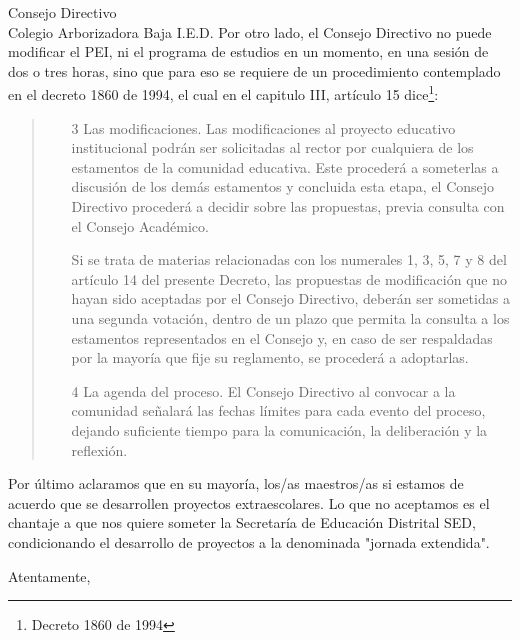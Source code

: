 \documentclass[letterpaper,spanish]{letter}
\begin{document}
\begin{letter}{Consejo Directivo\\Colegio Arborizadora Baja I.E.D.}
Por otro lado, el Consejo Directivo no puede modificar el PEI, ni el programa de estudios en un momento, en una sesión de dos o tres horas, sino que para eso se requiere de un procedimiento contemplado en el decreto 1860 de 1994, el cual en el capitulo III, artículo 15 dice\footnote{Decreto 1860 de 1994}:
\begin{quotation}
	\begin{enumerate}
	\item[3] Las modificaciones. Las modificaciones al proyecto educativo institucional podrán ser solicitadas al rector por 
cualquiera  de  los  estamentos  de  la  comunidad educativa.  Este  procederá  a  someterlas  a  discusión  de  los  
demás estamentos y concluida esta etapa, el Consejo Directivo procederá a decidir sobre las propuestas, previa 
consulta con el Consejo Académico.

Si  se  trata  de  materias  relacionadas  con  los  numerales  1,  3,  5,  7  y  8  del  artículo  14  del  presente  Decreto,  las propuestas de  modificación  que  no  hayan  sido  aceptadas  por  el  Consejo  Directivo,  deberán  ser  sometidas  a  
una  segunda  votación,  dentro  de  un  plazo  que  permita  la  consulta  a  los  estamentos  representados  en  el Consejo y, en caso de ser respaldadas por la mayoría que fije su reglamento, se procederá a adoptarlas.
\item[4] La  agenda  del  proceso.  El  Consejo  Directivo  al  convocar  a  la  comunidad  señalará  las  fechas  límites  para  
cada evento del proceso, dejando suficiente tiempo para la comunicación, la deliberación y la reflexión.
	\end{enumerate}
\end{quotation}

Por último aclaramos que en su mayoría, los/as maestros/as si estamos de acuerdo que se desarrollen proyectos extraescolares. Lo que no aceptamos es el chantaje a que nos quiere someter la Secretaría de Educación Distrital SED, condicionando el desarrollo de proyectos a la denominada "jornada extendida".

\closing{Atentamente,}
	\end{letter}
\end{document}
